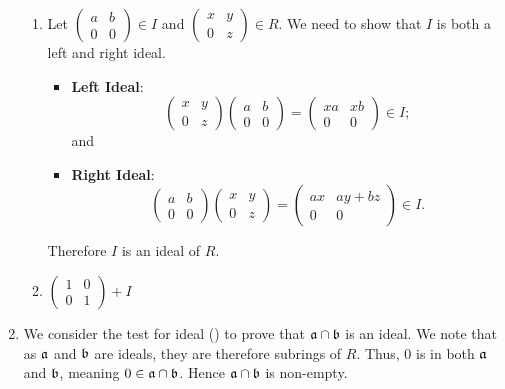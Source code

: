 \begin{enumerate}
\begin{enumerate}[label=(\roman*)]
        \item Let $\begin{pmatrix}a&b\\0&0\end{pmatrix} \in I$ and $\begin{pmatrix}x&y\\0&z\end{pmatrix} \in R$. We need to show that $I$ is both a left and right ideal.
        \begin{itemize}
            \item \textbf{Left Ideal}:
            \[
                \begin{pmatrix}x&y\\0&z\end{pmatrix}\begin{pmatrix}a&b\\0&0\end{pmatrix} = \begin{pmatrix}xa&xb\\0&0\end{pmatrix} \in I;
            \]
            and
            \item \textbf{Right Ideal}: \[
                \begin{pmatrix}a&b\\0&0\end{pmatrix}\begin{pmatrix}x&y\\0&z\end{pmatrix} = \begin{pmatrix}ax&ay+bz\\0&0\end{pmatrix} \in I.
            \]
        \end{itemize}
        Therefore $I$ is an ideal of $R$.

        \item $\begin{pmatrix}1&0\\0&1\end{pmatrix} + I$
    \end{enumerate}

    \item We consider the test for ideal () to prove that $\mathfrak{a}\cap\mathfrak{b}$ is an ideal. We note that as $\mathfrak{a}$ and $\mathfrak{b}$ are ideals, they are therefore subrings of $R$. Thus, 0 is in both $\mathfrak{a}$ and $\mathfrak{b}$, meaning $0 \in \mathfrak{a}\cap\mathfrak{b}$. Hence $\mathfrak{a}\cap\mathfrak{b}$ is non-empty.
    

\end{enumerate}
